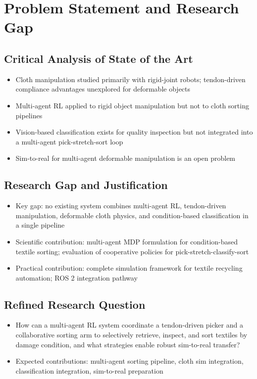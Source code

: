\chapter{Problem Statement and Research Gap}\label{ch:research_gap}

\section{Critical Analysis of State of the Art}
\begin{itemize}
    \item Cloth manipulation studied primarily with rigid-joint robots; tendon-driven compliance advantages unexplored for deformable objects
    \item Multi-agent RL applied to rigid object manipulation but not to cloth sorting pipelines
    \item Vision-based classification exists for quality inspection but not integrated into a multi-agent pick-stretch-sort loop
    \item Sim-to-real for multi-agent deformable manipulation is an open problem
\end{itemize}

\section{Research Gap and Justification}
\begin{itemize}
    \item Key gap: no existing system combines multi-agent RL, tendon-driven manipulation, deformable cloth physics, and condition-based classification in a single pipeline
    \item Scientific contribution: multi-agent MDP formulation for condition-based textile sorting; evaluation of cooperative policies for pick-stretch-classify-sort
    \item Practical contribution: complete simulation framework for textile recycling automation; ROS 2 integration pathway
\end{itemize}

\section{Refined Research Question}
\begin{itemize}
    \item How can a multi-agent RL system coordinate a tendon-driven picker and a collaborative sorting arm to selectively retrieve, inspect, and sort textiles by damage condition, and what strategies enable robust sim-to-real transfer?
    \item Expected contributions: multi-agent sorting pipeline, cloth sim integration, classification integration, sim-to-real preparation
\end{itemize}

